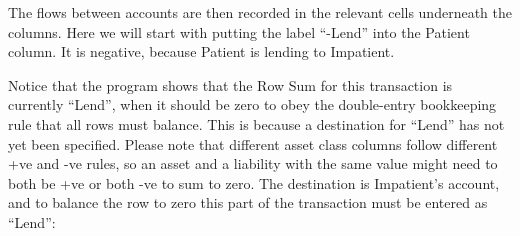 The flows between accounts are then recorded in the relevant cells
underneath the columns. Here we will start with putting the label
``-Lend'' into the Patient column. It is negative, because Patient
is lending to Impatient.


\begin{center}
\par\end{center}

Notice that the program shows that the Row Sum for this transaction
is currently ``Lend'', when it should be zero to obey the double-entry
bookkeeping rule that all rows must balance. This is because a destination
for ``Lend'' has not yet been specified. Please note that different
asset class columns follow different +ve and -ve rules, so an asset
and a liability with the same value might need to both be +ve or both
-ve to sum to zero. The destination is Impatient's account, and to
balance the row to zero this part of the transaction must be entered
as ``Lend'':


